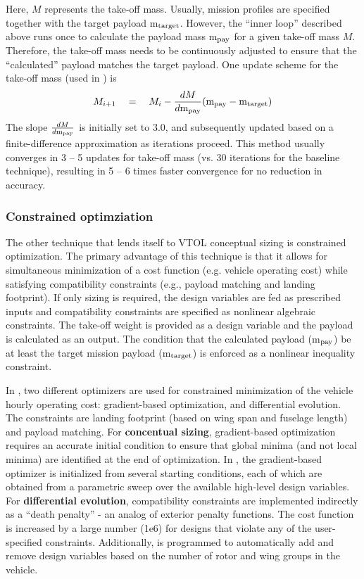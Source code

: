 Here, $M$ represents the take-off mass. Usually, mission profiles are specified together with the target payload m$_{\rm target}$. However, the ``inner loop'' described above runs once to calculate the payload mass m$_{\rm pay}$ for a given take-off mass $M$. Therefore, the take-off mass needs to be continuously adjusted to ensure that the ``calculated'' payload matches the target payload. One update scheme for the take-off mass (used in \hydra) is 
\begin{equation}
M_{i+1} \quad = \quad M_i - \frac{dM}{d\textrm{m}_{\rm pay}} (\textrm{m}_{\rm pay} - \textrm{m}_{\rm target})
\end{equation}
The slope $\frac{dM}{d\textrm{m}_{\rm pay}}$ is initially set to 3.0, and subsequently updated based on a finite-difference approximation as iterations proceed. This method usually converges in 3 -- 5 updates for take-off mass (vs. 30 iterations for the baseline technique), resulting in 5 -- 6 times faster convergence for no reduction in accuracy.

\subsubsection{Constrained optimziation}
The other technique that lends itself to VTOL conceptual sizing is constrained optimization. The primary advantage of this technique is that it allows for simultaneous minimization of a cost function (e.g. vehicle operating cost) while satisfying compatibility constraints (e.g., payload matching and landing footprint). If only sizing is required, the design variables are fed as prescribed inputs and compatibility constraints are specified as nonlinear algebraic constraints. The take-off weight is provided as a design variable and the payload is calculated as an output. The condition that the calculated payload (m$_{\rm pay}$) be at least the target mission payload (m$_{\rm target}$) is enforced as a nonlinear inequality constraint. 

In \hydra, two different optimizers are used for constrained minimization of the vehicle hourly operating cost: gradient-based optimization, and differential evolution. The constraints are landing footprint (based on wing span and fuselage length) and payload matching. For \textbf{concentual sizing}, gradient-based optimization requires an accurate initial condition to ensure that global minima (and not local minima) are identified at the end of optimization. In \hydra, the gradient-based optimizer is initialized from several starting conditions, each of which are obtained from a parametric sweep over the available high-level design variables. For \textbf{differential evolution}, compatibility constraints are implemented indirectly as a ``death penalty'' - an analog of exterior penalty functions. The cost function is increased by a large number (1e6) for designs that violate any of the user-specified constraints. Additionally, \hydra \spc is programmed to automatically add and remove design variables based on the number of rotor and wing groups in the vehicle. 

